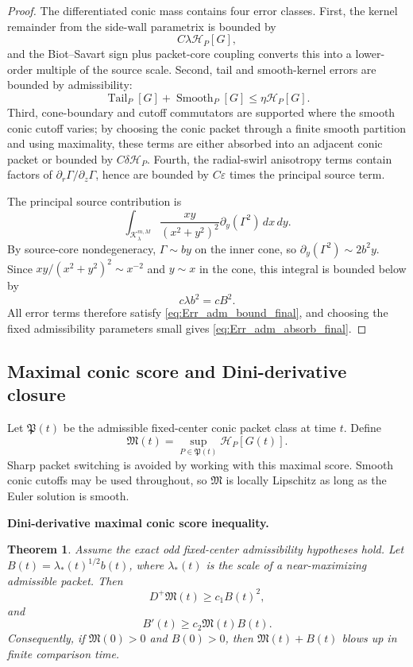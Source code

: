 \documentclass[11pt]{amsart}
\newtheorem{theorem}{Theorem}[section]
\newcommand{\Tail}{\operatorname{Tail}}
\begin{document}
\begin{proof}
The differentiated conic mass contains four error classes.  First, the kernel remainder from the side-wall parametrix is bounded by
\[
C\lambda\mathcal H_P[G],
\]
and the Biot--Savart sign plus packet-core coupling converts this into a lower-order multiple of the source scale.  Second, tail and smooth-kernel errors are bounded by admissibility:
\[
\Tail_P[G]+\operatorname{Smooth}_P[G]\le \eta\mathcal H_P[G].
\]
Third, cone-boundary and cutoff commutators are supported where the smooth conic cutoff varies; by choosing the conic packet through a finite smooth partition and using maximality, these terms are either absorbed into an adjacent conic packet or bounded by \(C\delta\mathcal H_P\).  Fourth, the radial-swirl anisotropy terms contain factors of \(\partial_r\Gamma/\partial_z\Gamma\), hence are bounded by \(C\varepsilon\) times the principal source term.

The principal source contribution is
\[
\int_{\mathcal K_\lambda^{m,M}}
\frac{xy}{(x^2+y^2)^2}\partial_y(\Gamma^2)\,dx\,dy.
\]
By source-core nondegeneracy, \(\Gamma\sim b y\) on the inner cone, so \(\partial_y(\Gamma^2)\sim 2b^2y\).  Since \(xy/(x^2+y^2)^2\sim x^{-2}\) and \(y\sim x\) in the cone, this integral is bounded below by
\[
c\lambda b^2=cB^2.
\]
All error terms therefore satisfy \eqref{eq:Err_adm_bound_final}, and choosing the fixed admissibility parameters small gives \eqref{eq:Err_adm_absorb_final}.
\end{proof}

\subsection{Maximal conic score and Dini-derivative closure}

Let \(\mathfrak P(t)\) be the admissible fixed-center conic packet class at time \(t\).  Define
\begin{equation}\label{eq:M_final}
\mathfrak M(t)=\sup_{P\in\mathfrak P(t)}\mathcal H_P[G(t)].
\end{equation}
Sharp packet switching is avoided by working with this maximal score.  Smooth conic cutoffs may be used throughout, so \(\mathfrak M\) is locally Lipschitz as long as the Euler solution is smooth.

\medskip
\noindent\textbf{Dini-derivative maximal conic score inequality.}
\begin{theorem}\label{thm:dini_final}
Assume the exact odd fixed-center admissibility hypotheses hold.  Let \(B(t)=\lambda_*(t)^{1/2}b(t)\), where \(\lambda_*(t)\) is the scale of a near-maximizing admissible packet.  Then
\begin{equation}\label{eq:Dini_final_M}
D^+\mathfrak M(t)
\ge
c_1B(t)^2,
\end{equation}
and
\begin{equation}\label{eq:Dini_final_B}
B'(t)
\ge
c_2\mathfrak M(t)B(t).
\end{equation}
Consequently, if \(\mathfrak M(0)>0\) and \(B(0)>0\), then \(\mathfrak M(t)+B(t)\) blows up in finite comparison time.
\end{theorem}
\end{document}
